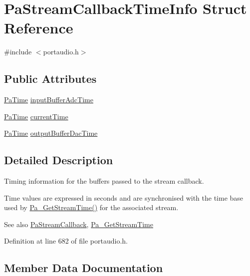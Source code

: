 \hypertarget{struct_pa_stream_callback_time_info}{}\section{Pa\+Stream\+Callback\+Time\+Info Struct Reference}
\label{struct_pa_stream_callback_time_info}


{\ttfamily \#include $<$portaudio.\+h$>$}

\subsection*{Public Attributes}
\begin{DoxyCompactItemize}
\item 
\hyperlink{portaudio_8h_af17a7e6d0471a23071acf8dbd7bbe4bd}{Pa\+Time} \hyperlink{struct_pa_stream_callback_time_info_ad114a6d5e1cf2cdd75837c33c1c8bb4c}{input\+Buffer\+Adc\+Time}
\item 
\hyperlink{portaudio_8h_af17a7e6d0471a23071acf8dbd7bbe4bd}{Pa\+Time} \hyperlink{struct_pa_stream_callback_time_info_af21eb5482cadb212dae38fdbbd9bebfb}{current\+Time}
\item 
\hyperlink{portaudio_8h_af17a7e6d0471a23071acf8dbd7bbe4bd}{Pa\+Time} \hyperlink{struct_pa_stream_callback_time_info_aa2052c42394fca748e83517fc8942609}{output\+Buffer\+Dac\+Time}
\end{DoxyCompactItemize}


\subsection{Detailed Description}
Timing information for the buffers passed to the stream callback.

Time values are expressed in seconds and are synchronised with the time base used by \hyperlink{portaudio_8h_a2b3fb60e6949f37f7f134105ff425749}{Pa\+\_\+\+Get\+Stream\+Time()} for the associated stream.

\begin{DoxySeeAlso}{See also}
\hyperlink{portaudio_8h_a8a60fb2a5ec9cbade3f54a9c978e2710}{Pa\+Stream\+Callback}, \hyperlink{pa__front_8c_a2b3fb60e6949f37f7f134105ff425749}{Pa\+\_\+\+Get\+Stream\+Time} 
\end{DoxySeeAlso}


Definition at line 682 of file portaudio.\+h.



\subsection{Member Data Documentation}
